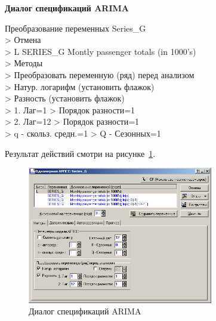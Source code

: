 
\begin{center}
  \textbf{Диалог спецификаций ARIMA}
\end{center}

Преобразование переменных Series\_G\\
> Отмена\\
> L SERIES\_G Montly passenger totals (in 1000's)\\
> Методы\\
> Преобразовать переменную (ряд) перед анализом\\
> Натур. логарифм (установить флажок)\\
> Разность (установить флажок)\\
> 1. Лаг=1 > Порядок разности=1\\
> 2. Лаг=12 > Порядок разности=1\\
> q - скольз. средн.=1 > Q - Сезонных=1

Результат действий смотри на рисунке~\ref{fig:11}.

\begin{figure}[!h]
  \centering

  \includegraphics[height=6cm]
  {inc/Series_G/11.PNG}

  \caption{Диалог спецификаций ARIMA}

  \label{fig:11}
\end{figure}


